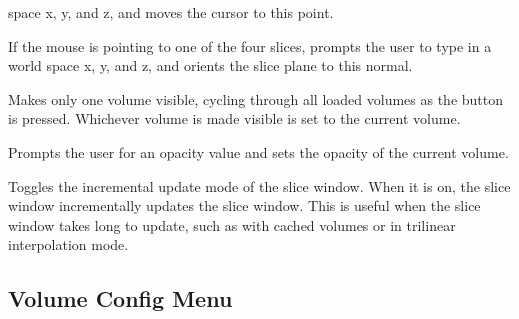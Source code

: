 \documentclass{article}
\newcommand{\menutwo}[2]{{\scriptsize \fbox{\bf #1}/\fbox{\bf #2}}}
\begin{document}
\begin{description}
       space x, y, and z, and moves the cursor to this point.
\item[\menutwo{Slice}{Type In Plane Normal}]  If the mouse is pointing to
       one of the four slices, prompts the user to type in a world
       space x, y, and z, and orients the slice plane to this normal.
\item[\menutwo{Slice}{Visible:}]  Makes only one volume visible, cycling
       through all loaded volumes as the button is pressed.  Whichever volume
       is made visible is set to the current volume.
\item[\menutwo{Slice}{Vol Opacity:}]  Prompts the user for an opacity
       value and sets the opacity of the current volume.
\item[\menutwo{Slice}{Increm Update:}]  Toggles the incremental
       update mode of the slice window.  When it is on, the slice
       window incrementally updates the slice window.  This is useful
       when the slice window takes long to update, such as with cached
       volumes or in trilinear interpolation mode.
\end{description}

\subsection{Volume Config Menu}
\end{document}
